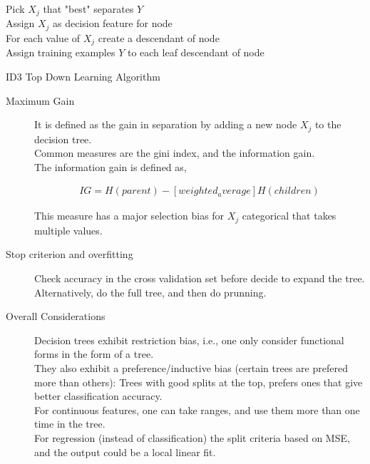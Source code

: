 \documentclass[10pt,landscape]{article}
\begin{document}
\begin{multicols*}{3}
    \begin{algorithm}[H]
        \SetAlgoLined
         {
        Pick $X_j$ that "best" separates $Y$ \\
        Assign $X_j$ as decision feature for node \\
        For each value of $X_j$ create a descendant of node \\
        Assign training examples $Y$ to each leaf descendant of node
        }
    \caption{ID3 Top Down Learning Algorithm}\label{alg:id3algo}
    \end{algorithm}

    \begin{description}

    \item[Maximum Gain]  It is defined as the gain in separation
    by adding a new node $X_j$ to the decision tree. \\

    Common measures are the gini index, and the information gain. \\

    The information gain is defined as,

    \begin{align*}
        IG = H(parent) - [weighted_average]H(children)
    \end{align*}

    This measure has a major selection bias for $X_j$ categorical that takes multiple values.

    \item[Stop criterion and overfitting] Check accuracy in the cross validation set
    before decide to expand the tree.  Alternatively, do the full tree, and then
    do prunning.

    \item[Overall Considerations]
    Decision trees exhibit restriction bias, i.e., one only consider
    functional forms in the form of a tree.  \\
    They also exhibit a preference/inductive bias (certain trees
    are prefered more than others):  Trees with good splits at the top,
    prefers ones that give better classification accuracy. \\
    For continuous features, one can take ranges, and use them more than one time in the tree. \\
    For regression (instead of classification) the split criteria based on MSE, and the output
    could be a local linear fit.


\end{description}
\end{multicols*}
\end{document}
